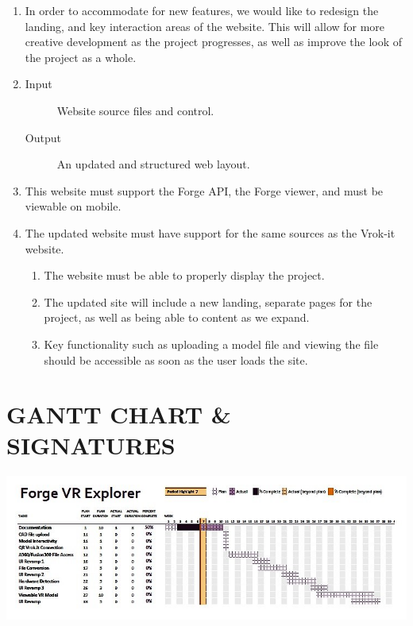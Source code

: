 \documentclass[letterpaper, 10pt, draftclsnofoot, compsoc, onecolumn]{IEEEtran}
\begin{document}
\begin{enumerate}
	\item In order to accommodate for new features, we would like to redesign the landing, and key interaction areas of the website. 
	This will allow for more creative development as the project progresses, as well as improve the look of the project as a whole.

	\item
	\begin{description}
	\item [Input] Website source files and control. 
	
	\item [Output] An updated and structured web layout.
	\end{description}

	\item This website must support the Forge API, the Forge viewer, and must be viewable on mobile. 

	\item The updated website must have support for the same sources as the Vrok-it website.

	\begin{enumerate}
		\item The website must be able to properly display the project. 
		\item The updated site will include a new landing, separate pages for the project, as well as being able to content as we expand. 
		\item Key functionality such as uploading a model file and viewing the file should be accessible as soon as the user loads the site.
	\end{enumerate}
\end{enumerate}

\clearpage
\section[GANTT CHART/SIGNATURES]{\rmfamily\bfseries\color{black}
GANTT CHART \& SIGNATURES}

\begin{center}
	\includegraphics[scale=0.8]{GanttChart.jpg}
\end{center}
\end{document}

